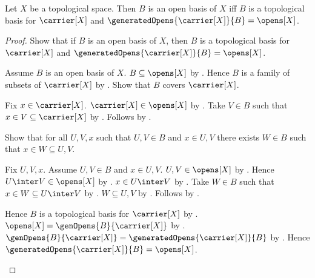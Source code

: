 \begin{theorem}\label{open_basis_iff_raw_basis_generates_opens}
    Let $X$ be a topological space.
    Then $B$ is an open basis of $X$ iff
        $B$ is a topological basis for $\carrier[X]$ and
        $\generatedOpens{\carrier[X]}{B}=\opens[X]$.
\end{theorem}
\begin{proof}
    Show that if $B$ is an open basis of $X$, then
        $B$ is a topological basis for $\carrier[X]$ and
        $\generatedOpens{\carrier[X]}{B}=\opens[X]$.
    \begin{subproof}
        Assume $B$ is an open basis of $X$.
        $B\subseteq\opens[X]$ by .
        Hence $B$ is a family of subsets of $\carrier[X]$ by
            .
        Show that $B$ covers $\carrier[X]$.
        \begin{subproof}
            Fix $x\in\carrier[X]$.
            $\carrier[X]\in\opens[X]$ by .
            Take $V\in B$ such that
                $x\in V\subseteq\carrier[X]$ by .
            Follows by \auto.
        \end{subproof}
        Show that for all $U,V,x$ such that $U,V\in B$ and $x\in U,V$
            there exists $W\in B$ such that $x\in W\subseteq U,V$.
        \begin{subproof}
            Fix $U,V,x$.
            Assume $U,V\in B$ and $x\in U,V$.
            $U,V\in\opens[X]$ by .
            Hence $U\inter V\in\opens[X]$ by .
            $x\in U\inter V$ by .
            Take $W\in B$ such that $x\in W\subseteq U\inter V$ by
                .
            $W\subseteq U,V$ by .
            Follows by \auto.
        \end{subproof}
        Hence $B$ is a topological basis for $\carrier[X]$ by
            .
        $\opens[X]=\genOpens{B}{\carrier[X]}$ by
            .
        $\genOpens{B}{\carrier[X]}
            =\generatedOpens{\carrier[X]}{B}$ by
            .
        Hence $\generatedOpens{\carrier[X]}{B}=\opens[X]$.
    \end{subproof}


\end{proof}
